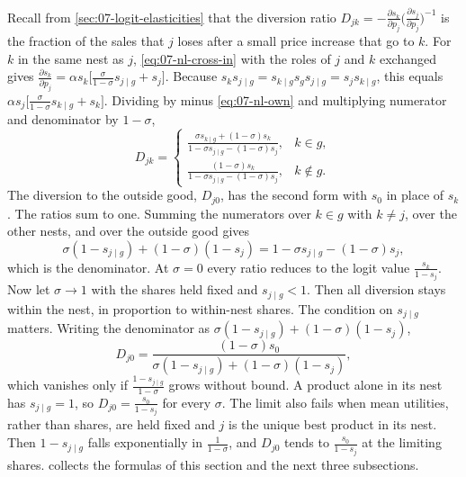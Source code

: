Recall from \cref{sec:07-logit-elasticities} that the diversion ratio $D_{jk} = -\frac{\partial s_k}{\partial
p_j}\big(\frac{\partial s_j}{\partial p_j}\big)^{-1}$ is the fraction of the sales that $j$ loses after a small price
increase that go to $k$. For $k$ in the same nest as $j$,
\eqref{eq:07-nl-cross-in} with the roles of $j$ and $k$ exchanged gives
$\frac{\partial s_k}{\partial p_j} = \alpha s_k\big[\frac{\sigma}{1-\sigma}s_{j \mid g} + s_j\big]$. Because
$s_ks_{j \mid g} = s_{k \mid g}s_gs_{j \mid g} = s_js_{k \mid g}$, this equals
$\alpha s_j\big[\frac{\sigma}{1-\sigma}s_{k \mid g} + s_k\big]$. Dividing by minus \eqref{eq:07-nl-own} and multiplying
numerator and denominator by $1 - \sigma$,
\begin{equation}\label{eq:07-nl-diversion}
D_{jk} =
\begin{cases}
\frac{\sigma s_{k \mid g} + (1-\sigma)s_k}{1 - \sigma s_{j \mid g} - (1-\sigma)s_j}, & k \in g, \\[6pt]
\frac{(1-\sigma)s_k}{1 - \sigma s_{j \mid g} - (1-\sigma)s_j}, & k \notin g .
\end{cases}
\end{equation}
The diversion to the outside good, $D_{j0}$, has the second form with $s_0$ in place of $s_k$. The ratios sum to one.
Summing the numerators over $k \in g$ with $k \neq j$, over the other nests, and over the outside good gives
\begin{equation*}
\sigma(1 - s_{j \mid g}) + (1-\sigma)(1 - s_j) = 1 - \sigma s_{j \mid g} - (1-\sigma)s_j ,
\end{equation*}
which is the denominator. At $\sigma = 0$ every ratio reduces to the logit value $\frac{s_k}{1-s_j}$. Now let
$\sigma \to 1$ with the shares held fixed and $s_{j \mid g} < 1$. Then all diversion stays within the nest, in
proportion to within-nest shares. The condition on $s_{j \mid g}$ matters. Writing the denominator as
$\sigma(1 - s_{j \mid g}) + (1-\sigma)(1 - s_j)$,
\begin{equation*}
D_{j0} = \frac{(1-\sigma)s_0}{\sigma(1 - s_{j \mid g}) + (1-\sigma)(1 - s_j)} ,
\end{equation*}
which vanishes only if $\frac{1 - s_{j \mid g}}{1-\sigma}$ grows without bound. A product alone in its nest has
$s_{j \mid g} = 1$, so $D_{j0} = \frac{s_0}{1 - s_j}$ for every $\sigma$. The limit also fails when mean utilities,
rather than shares, are held fixed and $j$ is the unique best product in its nest. Then $1 - s_{j \mid g}$ falls
exponentially in $\frac{1}{1-\sigma}$, and $D_{j0}$ tends to $\frac{s_0}{1 - s_j}$ at the limiting shares.
 collects the formulas of this section and the next three subsections.

